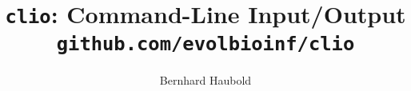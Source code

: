 \documentclass[a4paper]{article}
\begin{document}
\pagestyle{noweb}

\title{\texttt{clio}: Command-Line Input/Output\\
\small \texttt{github.com/evolbioinf/clio}}
\author{Bernhard Haubold}
\maketitle
\tableofcontents




\end{document}
